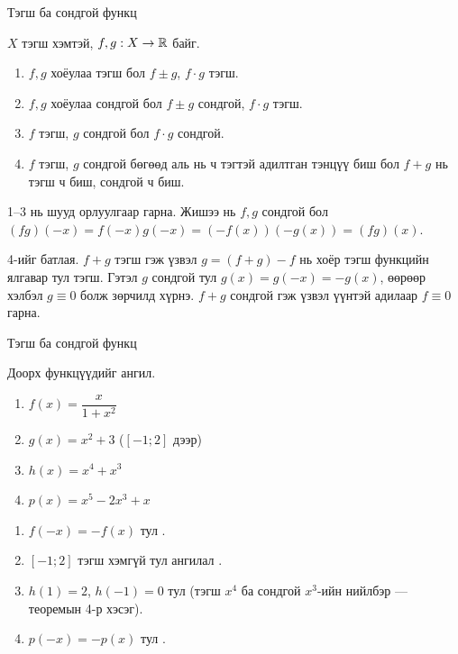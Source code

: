 \begin{frame}[allowframebreaks]{Тэгш ба сондгой функц}
\begin{theorem}
$X$ тэгш хэмтэй, $f,g:X\to\mathbb{R}$ байг.
\begin{enumerate}
  \item $f,g$ хоёулаа тэгш бол $f\pm g$, $f\cdot g$ тэгш.
  \item $f,g$ хоёулаа сондгой бол $f\pm g$ сондгой, $f\cdot g$ тэгш.
  \item $f$ тэгш, $g$ сондгой бол $f\cdot g$ сондгой.
  \item $f$ тэгш, $g$ сондгой бөгөөд аль нь ч тэгтэй адилтган тэнцүү биш бол
        $f+g$ нь тэгш ч биш, сондгой ч биш.
\end{enumerate}
\end{theorem}
\begin{prof}
1--3 нь шууд орлуулгаар гарна. Жишээ нь $f,g$ сондгой бол
$(fg)(-x)=f(-x)g(-x)=(-f(x))(-g(x))=(fg)(x)$.

4-ийг батлая. $f+g$ тэгш гэж үзвэл $g=(f+g)-f$ нь хоёр тэгш функцийн ялгавар тул тэгш.
Гэтэл $g$ сондгой тул $g(x)=g(-x)=-g(x)$, өөрөөр хэлбэл $g\equiv0$ болж зөрчилд хүрнэ.
$f+g$ сондгой гэж үзвэл үүнтэй адилаар $f\equiv0$ гарна.
\end{prof}
\end{frame}

\begin{frame}[allowframebreaks]{Тэгш ба сондгой функц}
\begin{problem}
Доорх функцүүдийг ангил.
\begin{enumerate}
  \item $f(x)=\dfrac{x}{1+x^2}$
  \item $g(x)=x^2+3$ \; ($[-1;2]$ дээр)
  \item $h(x)=x^4+x^3$
  \item $p(x)=x^5-2x^3+x$
\end{enumerate}
\end{problem}
\begin{solution}
\begin{enumerate}
  \item $f(-x)=-f(x)$ тул .
  \item $[-1;2]$ тэгш хэмгүй тул ангилал .
  \item $h(1)=2$, $h(-1)=0$ тул 
        (тэгш $x^4$ ба сондгой $x^3$-ийн нийлбэр --- теоремын 4-р хэсэг).
  \item $p(-x)=-p(x)$ тул .
\end{enumerate}
\end{solution}
\end{frame}

